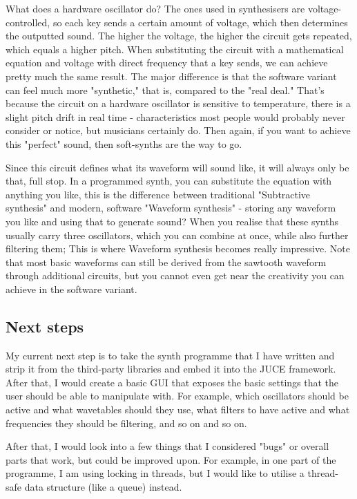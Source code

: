 What does a hardware oscillator do? The ones used in synthesisers are voltage-controlled, so each key sends a certain amount of voltage, which then determines the outputted sound. The higher the voltage, the higher the circuit gets repeated, which equals a higher pitch. When substituting the circuit with a mathematical equation and voltage with direct frequency that a key sends, we can achieve pretty much the same result. The major difference is that the software variant can feel much more "synthetic," that is, compared to the "real deal." That's because the circuit on a hardware oscillator is sensitive to temperature, there is a slight pitch drift in real time - characteristics most people would probably never consider or notice, but musicians certainly do. Then again, if you want to achieve this "perfect" sound, then soft-synths are the way to go.

Since this circuit defines what its waveform will sound like, it will always only be that, full stop. In a programmed synth, you can substitute the equation with anything you like, this is the difference between traditional "Subtractive synthesis" and modern, software "Waveform synthesis" - storing any waveform you like and using that to generate sound? When you realise that these synths usually carry three oscillators, which you can combine at once, while also further filtering them; This is where Waveform synthesis becomes really impressive. Note that most basic waveforms can still be derived from the sawtooth waveform through additional circuits, but you cannot even get near the creativity you can achieve in the software variant.

\subsection{Next steps}

My current next step is to take the synth programme that I have written and strip it from the third-party libraries and embed it into the JUCE framework. After that, I would create a basic GUI that exposes the basic settings that the user should be able to manipulate with. For example, which oscillators should be active and what wavetables should they use, what filters to have active and what frequencies they should be filtering, and so on and so on.

After that, I would look into a few things that I considered "bugs" or overall parts that work, but could be improved upon. For example, in one part of the programme, I am using locking in threads, but I would like to utilise a thread-safe data structure (like a queue) instead.

